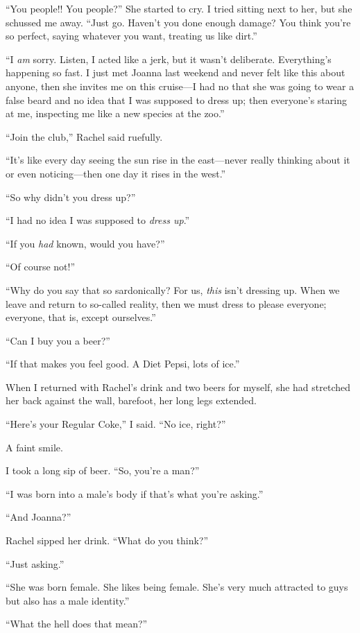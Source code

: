 ``You people!! You people?'' She started to cry. I tried sitting next to
her, but she schussed me away. ``Just go. Haven't you done enough
damage? You think you're so perfect, saying whatever you want, treating
us like dirt.''

``I \emph{am} sorry. Listen, I acted like a jerk, but it wasn't
deliberate. Everything's happening so fast. I just met Joanna last
weekend and never felt like this about anyone, then she invites me on
this cruise---I had no that she was going to wear a false beard and no
idea that I was supposed to dress up; then everyone's staring at me,
inspecting me like a new species at the zoo.''

``Join the club,'' Rachel said ruefully.

``It's like every day seeing the sun rise in the east---never really
thinking about it or even noticing---then one day it rises in the
west.''

``So why didn't you dress up?''

``I had no idea I was supposed to \emph{dress up}.''

``If you \emph{had} known, would you have?''

``Of course not!''

``Why do you say that so sardonically? For us, \emph{this} isn't
dressing up. When we leave and return to so-called reality, then we must
dress to please everyone; everyone, that is, except ourselves.''

``Can I buy you a beer?''

``If that makes you feel good. A Diet Pepsi, lots of ice.''

When I returned with Rachel's drink and two beers for myself, she had
stretched her back against the wall, barefoot, her long legs extended.

``Here's your Regular Coke,'' I said. ``No ice, right?''

A faint smile.

I took a long sip of beer. ``So, you're a man?''

``I was born into a male's body if that's what you're asking.''

``And Joanna?''

Rachel sipped her drink. ``What do you think?''

``Just asking.''

``She was born female. She likes being female. She's very much attracted
to guys but also has a male identity.''

``What the hell does that mean?''

